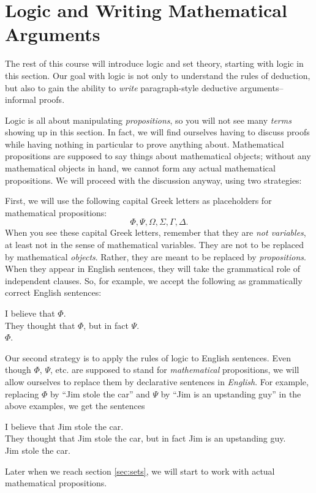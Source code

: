 \documentclass[12pt]{article}
\newcounter{rule}
\def\pA{\Phi}
\def\pB{\Psi}
\def\pC{\Omega}
\def\pD{\Sigma}
\def\pE{\Gamma}
\def\pF{\Delta}
\begin{document}
\section{Logic and Writing Mathematical Arguments}
\label{sec:logic}

The rest of this course will introduce logic and set theory, starting with logic in this section.
Our goal with logic is not only to understand the rules of deduction,
but also to gain the ability to \emph{write} paragraph-style deductive arguments-- informal proofs.

Logic is all about manipulating \emph{propositions}, so you will not see many \emph{terms} showing up in this section.
In fact, we will find ourselves having to discuss proofs while having nothing in particular to prove anything about.
Mathematical propositions are supposed to say things about mathematical objects;
without any mathematical objects in hand, we cannot form any actual mathematical propositions.
We will proceed with the discussion anyway, using two strategies:

First, we will use the following capital Greek letters as placeholders for mathematical propositions:
$$
\pA,
\pB,
\pC,
\pD,
\pE,
\pF.
$$
When you see these capital Greek letters, remember that they are \emph{not variables},
at least not in the sense of mathematical variables. They are not to be replaced by mathematical \emph{objects}.
Rather, they are meant to be replaced by \emph{propositions}.
When they appear in English sentences, they will take the grammatical role of independent clauses.
So, for example, we accept the following as grammatically correct English sentences:
\begin{adjustwidth}{2em}{}
I believe that $\pA$.\\
They thought that $\pA$, but in fact $\pB$.\\
$\pA$.
\end{adjustwidth}

Our second strategy
is to apply the rules of logic to English sentences.
Even though $\pA$, $\pB$, etc. are supposed to stand for \emph{mathematical} propositions,
we will allow ourselves to replace them by declarative sentences in \emph{English}.
For example, replacing $\pA$ by ``Jim stole the car'' and $\pB$ by ``Jim is an upstanding guy'' in the above examples, we get the sentences
\begin{adjustwidth}{2em}{}
I believe that Jim stole the car.\\
They thought that Jim stole the car, but in fact Jim is an upstanding guy.\\
Jim stole the car.
\end{adjustwidth}
Later when we reach section
\ref{sec:sets}, we will start to work with actual mathematical propositions.
\end{document}
